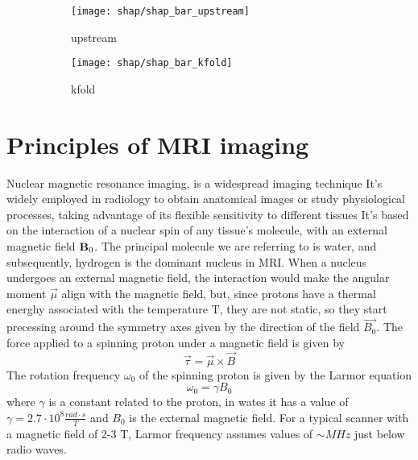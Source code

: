 \documentclass[a4paper,11pt]{article}
\begin{document}
\begin{figure}
\centering
\begin{subfigure}[b]{.45\textwidth}
   \texttt{[image: shap/shap\_bar\_upstream]}
   \caption{upstream}
   \label{}
\end{subfigure}
\begin{subfigure}[b]{.45\textwidth}
   \texttt{[image: shap/shap\_bar\_kfold]}
   \caption{kfold}
   \label{}
\end{subfigure}
\caption{}
\label{}
\end{figure}








\appendix
\section{Principles of MRI imaging}
Nuclear magnetic resonance imaging, is a widespread imaging technique It's widely employed in radiology to obtain anatomical images or study physiological processes, taking advantage of its flexible sensitivity to different tissues
It's based on the interaction of a nuclear spin of any tissue's molecule, with an external magnetic field $\textbf B_0$.
The principal molecule we are referring to is water, and subsequently, hydrogen is the dominant nucleus in MRI.
When a nucleus undergoes an external magnetic field, the interaction would make the angular moment $\overrightarrow{\mu}$ align with the magnetic field,
but, since protons have a thermal energhy associated with the temperature T, they are not static, so they start precessing around the symmetry axes given by the direction of the field $\overrightarrow{B_0}$.
The force applied to a spinning proton under a magnetic field is given by
\begin{equation}
\overrightarrow{\tau} = \overrightarrow{\mu} \times \overrightarrow{B}
\end{equation}
The rotation frequency $\omega_0$ of the spinning proton is given by the Larmor equation
\begin{equation}\label{eq:larmorfrequency}
\omega_0 = \gamma B_0
\end{equation}
where $\gamma$ is a constant related to the proton, in wates it has a value of $\gamma = 2.7\cdot 10^8 \frac{rad\cdot s}{T}$ and $B_0$ is the external magnetic field. For a typical scanner with a magnetic field of 2-3 T, Larmor frequency assumes values of $\sim MHz$ just below radio waves.
\end{document}
